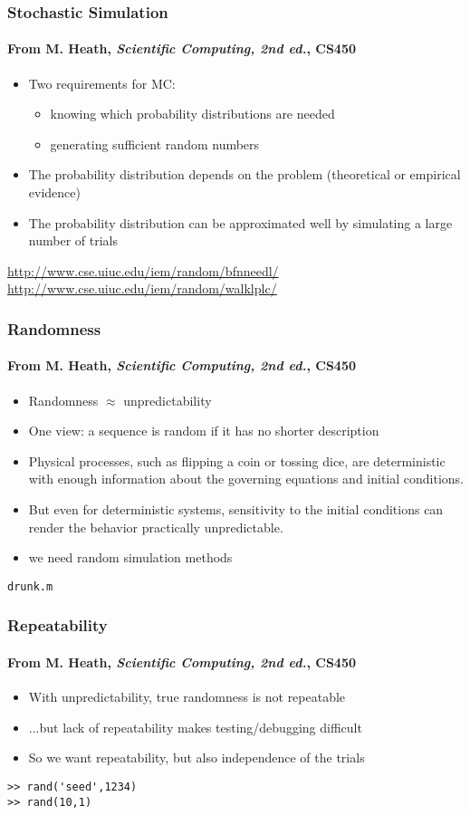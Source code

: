 \documentclass[10pt]{beamer}
\begin{document}
\begin{frame}
\frametitle{Stochastic Simulation}
\framesubtitle{From M. Heath, \emph{Scientific Computing, 2nd ed.}, CS450}
\begin{itemize}
    \item Two requirements for MC: 
    \begin{itemize}
    \item knowing which probability distributions are needed
    \item generating sufficient random numbers
    \end{itemize}
    \item The probability distribution depends on the problem (theoretical or
empirical evidence)
    \item The probability distribution can be approximated well by simulating a
large number of trials
\end{itemize}
\bigskip

\url{http://www.cse.uiuc.edu/iem/random/bfnneedl/}
\url{http://www.cse.uiuc.edu/iem/random/walklplc/}
\end{frame}
\begin{frame}
\frametitle{Randomness}
\framesubtitle{From M. Heath, \emph{Scientific Computing, 2nd ed.}, CS450}
\begin{itemize}
    \item Randomness $\approx$ unpredictability
    \item One view: a sequence is random if it has no shorter description
    \item Physical processes, such as flipping a coin or tossing dice, are
deterministic with enough information about the governing equations and initial
conditions.
    \item But even for deterministic systems, sensitivity to the initial
conditions can render the behavior practically unpredictable.
    \item we need random simulation methods
\end{itemize}
\bigskip

\texttt{drunk.m}
\end{frame}
\begin{frame}[fragile]
\frametitle{Repeatability}
\framesubtitle{From M. Heath, \emph{Scientific Computing, 2nd ed.}, CS450}
\begin{itemize}
    \item With unpredictability, true randomness is not repeatable
    \item ...but lack of repeatability makes testing/debugging difficult
    \item So we want repeatability, but also independence of the trials
\end{itemize}
\bigskip

\begin{lstlisting}
>> rand('seed',1234)  
>> rand(10,1)      
\end{lstlisting}

\end{frame}
\end{document}
